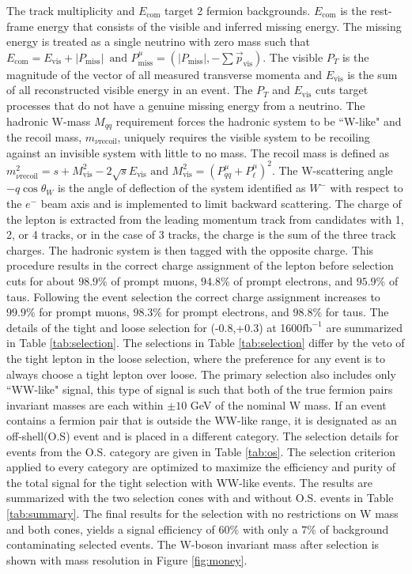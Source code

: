 The track multiplicity and $E_{\text{com}}$ target 2 fermion backgrounds. $E_{\text{com}}$ is the rest-frame energy that consists of the visible and inferred missing energy. The missing energy is treated as a single neutrino with zero mass such that $E_{\text{com}} = E_{\text{vis}} + |P_{\text{miss}}| \, \,  \, \text{and} \, \, P^\mu_{\text{miss}} = (|P_{\text{miss}}| , -\sum{\vec{p}_{\text{vis}}})$. The visible $P_T$ is the magnitude of the vector of all measured transverse momenta and $E_{\text{vis}}$ is the sum of all reconstructed visible energy in an event. The $P_T$ and $E_{\text{vis}}$ cuts target processes that do not have a genuine missing energy from a neutrino. The hadronic W-mass $M_{qq}$ requirement forces the hadronic system to be ``W-like" and the recoil mass, $m_{\nu \text{recoil}}$, uniquely requires the visible system to be recoiling against an invisible system with little to no mass. The recoil mass is defined as $m^2_{\nu \text{recoil}} = s + M^2_{\text{vis}} - 2\sqrt{s}E_{\text{vis}} \, \, \text{and} \, \, M^2_{\text{vis}} = ( P^{\mu}_{qq} +  P^{\mu}_{\ell})^2$. The W-scattering angle $-q\cos\theta_W$ is the angle of deflection of the system identified as $W^-$ with respect to the $e^-$ beam axis and is implemented to limit backward scattering.  The charge of the lepton is extracted from the leading momentum track from candidates with 1, 2, or 4 tracks, or in the case of 3 tracks, the charge is the sum of the three track charges. The hadronic system is then tagged with the opposite charge.  This procedure results in the correct charge assignment of the lepton before selection cuts for about $98.9\%$ of prompt muons, $94.8\%$ of prompt electrons, and $95.9\%$ of taus. Following the event selection the correct charge assignment increases to $99.9\%$ for prompt muons, $98.3\%$ for prompt electrons, and $98.8\%$ for taus. The details of the tight and loose selection for (-0.8,+0.3) at 1600$\text{fb}^{-1}$ are summarized in Table \ref{tab:selection}. The selections in Table \ref{tab:selection} differ by the veto of the tight lepton in the loose selection, where the preference for any event is to always choose a tight lepton over loose. The primary selection also includes only ``WW-like" signal, this type of signal is such that both of the true fermion pairs invariant masses are each within $\pm10$ GeV of the nominal W mass. If an event contains a fermion pair that is outside the WW-like range, it is designated as an off-shell(O.S) event and is placed in a different category. The selection details for events from the O.S. category are given in Table \ref{tab:os}. The selection criterion applied to every category are optimized to maximize the efficiency and purity of the total signal for the tight selection with WW-like events. The results are summarized with the two selection cones with and without O.S. events in Table \ref{tab:summary}. The final results for the selection with no restrictions on W mass and both cones, yields a signal efficiency of $60\%$ with only a $7\%$ of background contaminating selected events. The W-boson invariant mass after selection is shown with mass resolution in Figure \ref{fig:money}.


